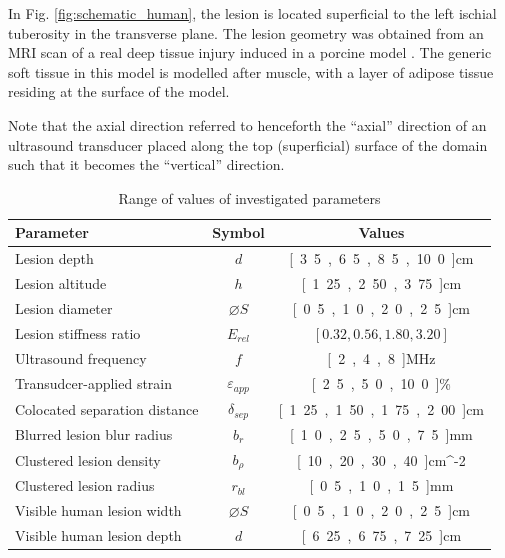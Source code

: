 		In Fig. \ref{fig:schematic_human}, the lesion is located superficial to the left ischial tuberosity in the transverse plane. The lesion geometry was obtained from an MRI scan of a real deep tissue injury induced in a porcine model \cite{solis13}. The generic soft tissue in this model is modelled after muscle, with a layer of adipose tissue residing at the surface of the model.

		Note that the axial direction referred to henceforth  the ``axial'' direction of an ultrasound transducer placed along the top (superficial) surface of the domain such that it becomes the ``vertical'' direction.

		\begin{table}[!t]
			\centering
			\caption{Range of values of investigated parameters}
			\label{tab:parametervalues}
			\begin{tabular}{lcc}
				\toprule
				Parameter & Symbol & Values \\
				\midrule
				Lesion depth & $d$ & \unit{[3.5, 6.5, 8.5, 10.0]}{cm} \\
				Lesion altitude & $h$ & \unit{[1.25, 2.50, 3.75]}{cm} \\
				Lesion diameter & $\diameter S$ & \unit{[0.5, 1.0, 2.0, 2.5]}{cm} \\
				Lesion stiffness ratio & $E_{rel}$ & $[0.32, 0.56, 1.80, 3.20]$ \\
				Ultrasound frequency & $f$ & \unit{[2, 4, 8]}{MHz} \\
				Transudcer-applied strain & $\varepsilon_{app}$ & \unit{[2.5, 5.0, 10.0]}{\%} \\
				Colocated separation distance & $\delta_{sep}$ & \unit{[1.25, 1.50, 1.75, 2.00]}{cm} \\
				Blurred lesion blur radius & $b_r$ & \unit{[1.0, 2.5, 5.0, 7.5]}{mm} \\
				Clustered lesion density & $b_\rho$ & \unit{[10, 20, 30, 40]}{cm^{-2}} \\
				Clustered lesion radius & $r_{bl}$ & \unit{[0.5, 1.0, 1.5]}{mm} \\
				Visible human lesion width & $\diameter S$ & \unit{[0.5, 1.0, 2.0, 2.5]}{cm} \\
				Visible human lesion depth & $d$ & \unit{[6.25, 6.75, 7.25]}{cm} \\
				\bottomrule
			\end{tabular}
		\end{table}

